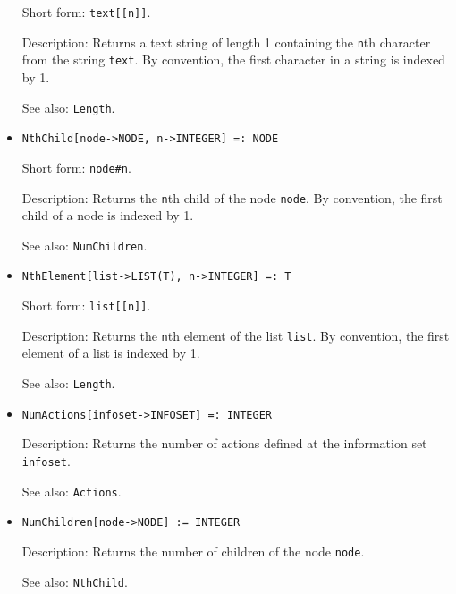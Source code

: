 \begin{itemize}
\bd
\item
[Short form:] \verb+text[[n]]+.
\item
[Description:] Returns a text string of length 1 containing the \verb+n+th
character from the string \verb+text+.  By convention, the first character
in a string is indexed by 1.
\item
[See also:] {\tt Length}.
\ed

\item
\protect \large \begin{verbatim} 
NthChild[node->NODE, n->INTEGER] =: NODE
\end{verbatim}\normalsize

\bd
\item
[Short form:] \verb+node#n+.
\item
[Description:] Returns the \verb+n+th child of the node \verb+node+.
By convention, the first child of a node is indexed by 1.
\item
[See also:] {\tt NumChildren}.
\ed

\item
\protect \large \begin{verbatim}
NthElement[list->LIST(T), n->INTEGER] =: T 
\end{verbatim}\normalsize

\bd
\item
[Short form:] \verb+list[[n]]+.
\item
[Description:] Returns the \verb+n+th element of the list \verb+list+.
By convention, the first element of a list is indexed by 1.
\item
[See also:] {\tt Length}.
\ed

\item
\protect \large \begin{verbatim}
NumActions[infoset->INFOSET] =: INTEGER
\end{verbatim}\normalsize

\bd
\item
[Description:] Returns the number of actions defined at the information
set \verb+infoset+.
\item
[See also:] {\tt Actions}.
\ed

\item
\protect \large \begin{verbatim}
NumChildren[node->NODE] := INTEGER
\end{verbatim}\normalsize

\bd
\item
[Description:] Returns the number of children of the node \verb+node+.
\item
[See also:] {\tt NthChild}.
\ed


\end{itemize}
